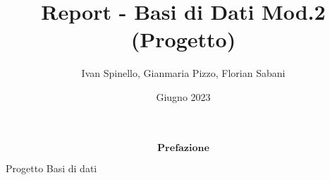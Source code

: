 \documentclass{book}
\title{Report - Basi di Dati Mod.2 (Progetto)}
\author{Ivan Spinello, Gianmaria Pizzo, Florian Sabani}
\date{Giugno 2023}
\begin{document}
\frontmatter
\maketitle
$$ \textbf{Prefazione} $$

Progetto Basi di dati

\mainmatter
\tableofcontents
    
    
    
    
    
    
    
\end{document}
